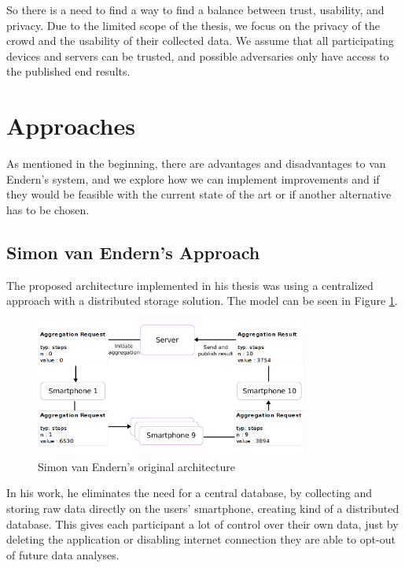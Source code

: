 So there is a need to find a way to find a balance between trust, usability, and privacy. Due to the limited scope of the thesis, we focus on the privacy of the crowd and the usability of their collected data. We assume that all participating devices and servers can be trusted, and possible adversaries only have access to the published end results.

\section{Approaches}
As mentioned in the beginning, there are advantages and disadvantages to van Endern's \cite{simon} system, and we explore how we can implement improvements and if they would be feasible with the current state of the art or if another alternative has to be chosen.

\subsection{Simon van Endern's Approach}
The proposed architecture implemented in his thesis was using a centralized approach with a distributed storage solution. The model can be seen in Figure \ref{fig:simon_original}.

\begin{figure}[htpb]
  \centering
  \includegraphics[width=0.8\textwidth]{figures/simon_original.png}
  \caption{Simon van Endern's original architecture \cite{simon}} \label{fig:simon_original}
\end{figure}

In his work, he eliminates the need for a central database, by collecting and storing raw data directly on the users' smartphone, creating kind of a distributed database. This gives each participant a lot of control over their own data, just by deleting the application or disabling internet connection they are able to opt-out of future data analyses.

